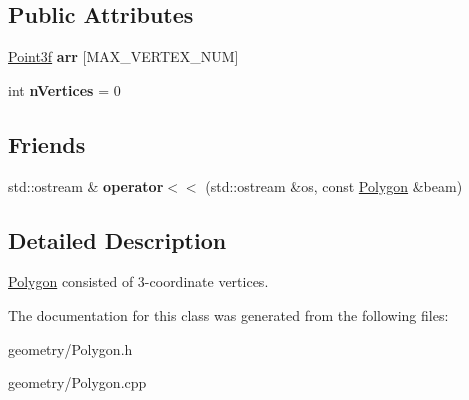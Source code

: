 \subsection*{Public Attributes}
\begin{DoxyCompactItemize}
\item 
\mbox{\label{class_polygon_a5e9924cf3d12df34b38dc75707c05254}} 
\mbox{\hyperlink{struct_point3f}{Point3f}} {\bfseries arr} \mbox{[}M\+A\+X\+\_\+\+V\+E\+R\+T\+E\+X\+\_\+\+N\+UM\mbox{]}
\item 
\mbox{\label{class_polygon_acad554243e51c93bbb13371c576006ea}} 
int {\bfseries n\+Vertices} = 0
\end{DoxyCompactItemize}
\subsection*{Friends}
\begin{DoxyCompactItemize}
\item 
\mbox{\label{class_polygon_a3d971bd1da5beb2188d6d011bf0becdd}} 
std\+::ostream \& {\bfseries operator$<$$<$} (std\+::ostream \&os, const \mbox{\hyperlink{class_polygon}{Polygon}} \&beam)
\end{DoxyCompactItemize}


\subsection{Detailed Description}
\mbox{\hyperlink{class_polygon}{Polygon}} consisted of 3-\/coordinate vertices. 

The documentation for this class was generated from the following files\+:\begin{DoxyCompactItemize}
\item 
geometry/Polygon.\+h\item 
geometry/Polygon.\+cpp\end{DoxyCompactItemize}
